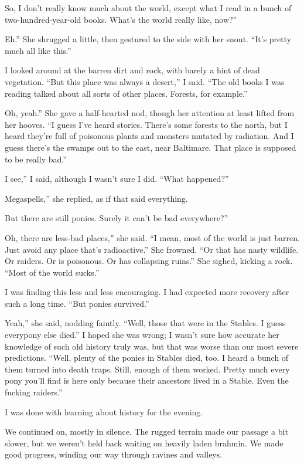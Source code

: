 \leavevmode{}So, I don’t really know much about the world, except what I read in a bunch of two-hundred-year-old books. What’s the world really like, now?”

\leavevmode{}Eh.” She shrugged a little, then gestured to the side with her snout. “It’s pretty much all like this.”

I looked around at the barren dirt and rock, with barely a hint of dead vegetation. “But this place was always a desert,” I said. “The old books I was reading talked about all sorts of other places. Forests, for example.”

\leavevmode{}Oh, yeah.” She gave a half-hearted nod, though her attention at least lifted from her hooves. “I guess I’ve heard stories. There’s some forests to the north, but I heard they’re full of poisonous plants and monsters mutated by radiation. And I guess there’s the swamps out to the east, near Baltimare. That place is supposed to be really bad.”

\leavevmode{}I see,” I said, although I wasn’t sure I did. “What happened?”

\leavevmode{}Megaspells,” she replied, as if that said everything.

\leavevmode{}But there are still ponies. Surely it can’t be bad everywhere?”

\leavevmode{}Oh, there are less-bad places,” she said. “I mean, most of the world is just barren. Just avoid any place that’s radioactive.” She frowned. “Or that has nasty wildlife. Or raiders. Or is poisonous. Or has collapsing ruins.” She sighed, kicking a rock. “Most of the world sucks.”

I was finding this less and less encouraging. I had expected more recovery after such a long time. “But ponies survived.”

\leavevmode{}Yeah,” she said, nodding faintly. “Well, those that were in the Stables. I guess everypony else died.” I hoped she was wrong; I wasn’t sure how accurate her knowledge of such old history truly was, but that was worse than our most severe predictions. “Well, plenty of the ponies in Stables died, too. I heard a bunch of them turned into death traps. Still, enough of them worked. Pretty much every pony you’ll find is here only because their ancestors lived in a Stable. Even the fucking raiders.”

I was done with learning about history for the evening.

{\br}%
We continued on, mostly in silence. The rugged terrain made our passage a bit slower, but we weren’t held back waiting on heavily laden brahmin. We made good progress, winding our way through ravines and valleys.

